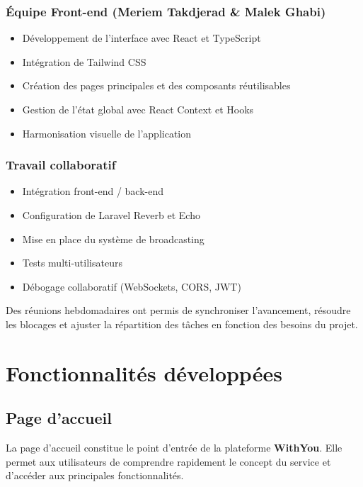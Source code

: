 \documentclass[12pt,a4paper]{report}
\begin{document}
\subsection*{Équipe Front-end (Meriem Takdjerad \& Malek Ghabi)}
\begin{itemize}
  \item Développement de l’interface avec React et TypeScript
  \item Intégration de Tailwind CSS
  \item Création des pages principales et des composants réutilisables
  \item Gestion de l’état global avec React Context et Hooks
  \item Harmonisation visuelle de l’application
\end{itemize}

\subsection*{Travail collaboratif}
\begin{itemize}
  \item Intégration front-end / back-end
  \item Configuration de Laravel Reverb et Echo
  \item Mise en place du système de broadcasting
  \item Tests multi-utilisateurs
  \item Débogage collaboratif (WebSockets, CORS, JWT)
\end{itemize}

Des réunions hebdomadaires ont permis de synchroniser l’avancement, résoudre les blocages et ajuster la répartition des tâches en fonction des besoins du projet.












\chapter{Fonctionnalités développées}

\section{Page d’accueil}

La page d’accueil constitue le point d’entrée de la plateforme \textbf{WithYou}. Elle permet aux utilisateurs de comprendre rapidement le concept du service et d’accéder aux principales fonctionnalités.
\end{document}
